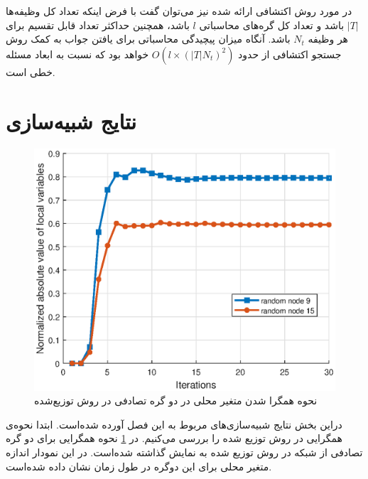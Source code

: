 	در مورد روش اکتشافی ارائه شده نیز می‌توان گفت با فرض اینکه تعداد کل وظیفه‌ها $|T|$ باشد و تعداد کل گره‌های محاسباتی $l$ باشد، همچنین حداکثر تعداد قابل تقسیم برای هر وظیفه $N_t$ باشد. آنگاه میزان پیچیدگی محاسباتی برای یافتن جواب به کمک روش جستجو اکتشافی از حدود $O(l\times(|T|N_t)^2)$ خواهد بود که نسبت به ابعاد مسئله خطی است. 
	
\section{نتایج شبیه‌سازی}

\begin{figure}[h!]
	\centerline{\includegraphics[width=12cm]{graphics/4-heuristic-dist/distributed_local_vars_convergence}}
	\caption{نحوه‌ همگرا شدن متغیر محلی در دو گره تصادفی در روش توزیع‌شده}
	\label{fig:distributed_local_vars_convergence}
\end{figure}

	دراین بخش نتایج شبیه‌سازی‌های مربوط به این فصل آورده شده‌است. ابتدا نحوه‌ی همگرایی در روش توزیع شده را بررسی می‌کنیم. در \cref{fig:distributed_local_vars_convergence} نحوه همگرایی برای دو گره تصادفی از شبکه در روش توزیع شده به نمایش گذاشته شده‌است. در این نمودار اندازه متغیر محلی برای این دوگره در طول زمان نشان داده شده‌است. 
	

